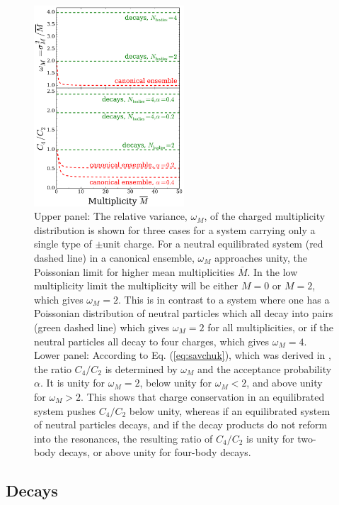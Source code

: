 \begin{figure}
\centerline{\includegraphics[width=0.5\textwidth]{figs/savchuk}}
\caption{\label{fig:savchuk}
Upper panel: The relative variance, $\omega_M$, of the charged multiplicity distribution is shown for three cases for a system carrying only a single type of $\pm$unit charge. For a neutral equilibrated system (red dashed line) in a canonical ensemble, $\omega_M$ approaches unity, the Poissonian limit for higher mean multiplicities $\overline{M}$. In the low multiplicity limit the multiplicity will be either $M=0$ or $M=2$, which gives $\omega_M=2$. This is in contrast to a system where one has a Poissonian distribution of neutral particles which all decay into pairs (green dashed line) which gives $\omega_M=2$ for all multiplicities, or if the neutral particles all decay to four charges, which gives $\omega_M=4$.
Lower panel: According to Eq. (\ref{eq:savchuk}), which was derived in \cite{Savchuk:2019xfg}, the ratio $C_4/C_2$ is determined by $\omega_M$ and the acceptance probability $\alpha$. It is unity for $\omega_M=2$, below unity for $\omega_M<2$, and above unity for $\omega_M>2$. This shows that charge conservation in an equilibrated system pushes $C_4/C_2$ below unity, whereas if an equilibrated system of neutral particles decays, and if the decay products do not reform into the resonances, the resulting ratio of $C_4/C_2$ is unity for two-body decays, or above unity for four-body decays.}
\end{figure}

\subsection{Decays}\label{sec:decays}

